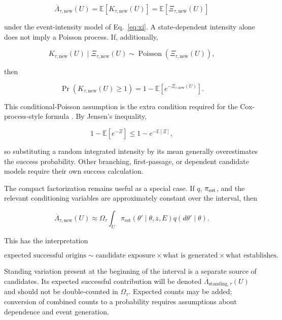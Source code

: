 \documentclass[11pt,a4paper]{article}
\begin{document}
\begin{equation}
\overline\Lambda_{\tau,\mathrm{new}}(U)
=
\mathbb E[K_{\tau,\mathrm{new}}(U)]
=
\mathbb E[\Xi_{\tau,\mathrm{new}}(U)]
\label{eq:expected-success-count}
\end{equation}

under the event-intensity model of Eq.~\eqref{eq:xi}. A state-dependent intensity alone does not imply a Poisson process. If, additionally,

\begin{equation}
K_{\tau,\mathrm{new}}(U)\mid\Xi_{\tau,\mathrm{new}}(U)
\sim
\operatorname{Poisson}\!\left(\Xi_{\tau,\mathrm{new}}(U)\right),
\label{eq:conditional-poisson}
\end{equation}

then

\begin{equation}
\Pr(K_{\tau,\mathrm{new}}(U)\ge1)
=
1-\mathbb E\!\left[e^{-\Xi_{\tau,\mathrm{new}}(U)}\right].
\label{eq:success-probability}
\end{equation}

This conditional-Poisson assumption is the extra condition required for the Cox-process-style formula \citep{LastPenrose2017}. By Jensen's inequality,

\begin{equation}
1-\mathbb E[e^{-\Xi}]
\le
1-e^{-\mathbb E[\Xi]},
\label{eq:jensen}
\end{equation}

so substituting a random integrated intensity by its mean generally overestimates the success probability. Other branching, first-passage, or dependent candidate models require their own success calculation.

The compact factorization remains useful as a special case. If $q$, $\pi_{\rm est}$, and the relevant conditioning variables are approximately constant over the interval, then

\begin{equation}
\overline\Lambda_{\tau,\mathrm{new}}(U)
\approx
\Omega_\tau
\int_U
\pi_{\mathrm{est}}(\theta'\mid\theta,z,E)
q(d\theta'\mid\theta).
\label{eq:factorized-count}
\end{equation}

This has the interpretation

\[
\boxed{
\text{expected successful origins}
\sim
\text{candidate exposure}
\times
\text{what is generated}
\times
\text{what establishes}.
}
\]

Standing variation present at the beginning of the interval is a separate source of candidates. Its expected successful contribution will be denoted $\overline\Lambda_{\mathrm{standing},\tau}(U)$ and should not be double-counted in $\Omega_\tau$. Expected counts may be added; conversion of combined counts to a probability requires assumptions about dependence and event generation.
\end{document}

